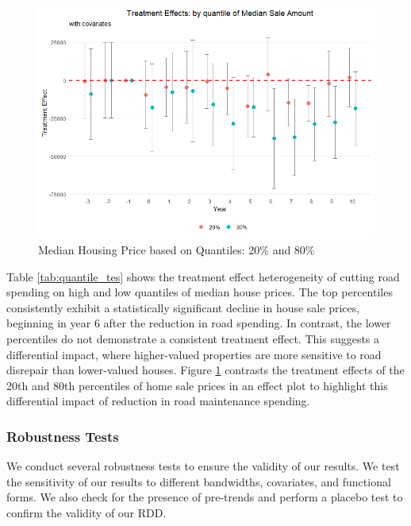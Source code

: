 \begin{figure}[htbp]
    \centering
    \includegraphics[width=\textwidth,keepaspectratio]{images/tes_qte_re.png}    
    \caption{Median Housing Price based on Quantiles: 20\% and 80\%}
    \label{fig:tes_qte_covs}
\end{figure}

Table \ref{tab:quantile_tes} shows the treatment effect heterogeneity of cutting road spending on high and low quantiles of median house prices. The top percentiles consistently exhibit a statistically significant decline in house sale prices, beginning in year 6 after the reduction in road spending. In contrast, the lower percentiles do not demonstrate a consistent treatment effect. This suggests a differential impact, where higher-valued properties are more sensitive to road disrepair than lower-valued houses. Figure \ref{fig:tes_qte_covs} contrasts the treatment effects of the 20th and 80th percentiles of home sale prices in an effect plot to highlight this differential impact of reduction in road maintenance spending.

\subsubsection{Robustness Tests} We conduct several robustness tests to ensure the validity of our results. We test the sensitivity of our results to different bandwidths, covariates, and functional forms. We also check for the presence of pre-trends and perform a placebo test to confirm the validity of our RDD.

\vskip 0.5cm

